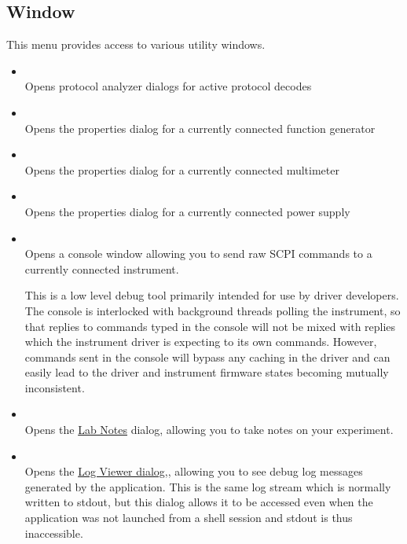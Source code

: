 \subsection{Window}

This menu provides access to various utility windows.

\begin{itemize}

\item {}\\
Opens protocol analyzer dialogs for active protocol decodes

\item {}\\
Opens the properties dialog for a currently connected function generator

\item {}\\
Opens the properties dialog for a currently connected multimeter

\item {}\\
Opens the properties dialog for a currently connected power supply

\item {}\\
Opens a console window allowing you to send raw SCPI commands to a currently connected instrument.

This is a low level debug tool primarily intended for use by driver developers. The console is interlocked with
background threads polling the instrument, so that replies to commands typed in the console will not be mixed with
replies which the instrument driver is expecting to its own commands. However, commands sent in the console will bypass
any caching in the driver and can easily lead to the driver and instrument firmware states becoming mutually
inconsistent.

\item {}\\
Opens the \hyperref[dlg:labnotes]{Lab Notes} dialog, allowing you to take notes on your experiment.

\item {}\\
Opens the \hyperref[dlg:logviewer]{Log Viewer dialog,},  allowing you to see debug log messages generated by the
application. This is the same log stream which is normally written to stdout, but this dialog allows it to be accessed
even when the application was not launched from a shell session and stdout is thus inaccessible.


\end{itemize}
